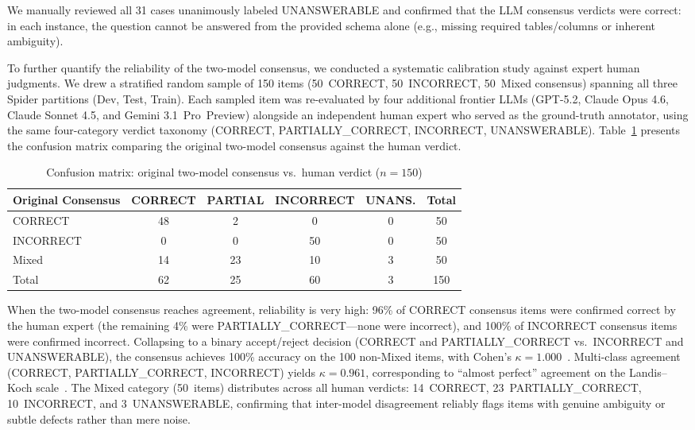 \documentclass[print]{einformatica}
\begin{document}
We manually reviewed all 31 cases unanimously labeled UNANSWERABLE and confirmed that the LLM consensus verdicts were correct: in each instance, the question cannot be answered from the provided schema alone (e.g., missing required tables/columns or inherent ambiguity).

\label{sec:calibration}To further quantify the reliability of the two-model consensus, we conducted a systematic calibration study against expert human judgments. We drew a stratified random sample of 150 items (50~CORRECT, 50~INCORRECT, 50~Mixed consensus) spanning all three Spider partitions (Dev, Test, Train). Each sampled item was re-evaluated by four additional frontier LLMs (GPT-5.2, Claude Opus 4.6, Claude Sonnet 4.5, and Gemini 3.1~Pro~Preview) alongside an independent human expert who served as the ground-truth annotator, using the same four-category verdict taxonomy (CORRECT, PARTIALLY\_CORRECT, INCORRECT, UNANSWERABLE). Table~\ref{tab:calibration} presents the confusion matrix comparing the original two-model consensus against the human verdict.

\begin{table}[ht]
    \caption{Confusion matrix: original two-model consensus vs.\ human verdict ($n=150$)}
    \label{tab:calibration}
    \centering
    \footnotesize
    \begin{tabular}{lccccc}
        \toprule
        \textbf{Original Consensus} & \textbf{CORRECT} & \textbf{PARTIAL} & \textbf{INCORRECT} & \textbf{UNANS.} & \textbf{Total} \\
        \midrule
        CORRECT          & 48 & 2  & 0  & 0 & 50 \\
        INCORRECT        & 0  & 0  & 50 & 0 & 50 \\
        Mixed            & 14 & 23 & 10 & 3 & 50 \\
        \midrule
        Total            & 62 & 25 & 60 & 3 & 150 \\
        \bottomrule
    \end{tabular}
\end{table}

When the two-model consensus reaches agreement, reliability is very high: 96\% of CORRECT consensus items were confirmed correct by the human expert (the remaining 4\% were PARTIALLY\_CORRECT---none were incorrect), and 100\% of INCORRECT consensus items were confirmed incorrect. Collapsing to a binary accept/reject decision (CORRECT and PARTIALLY\_CORRECT vs.\ INCORRECT and UNANSWERABLE), the consensus achieves 100\% accuracy on the 100 non-Mixed items, with Cohen's $\kappa = 1.000$~\cite{cohen1960coefficient}. Multi-class agreement (CORRECT, PARTIALLY\_CORRECT, INCORRECT) yields $\kappa = 0.961$, corresponding to ``almost perfect'' agreement on the Landis--Koch scale~\cite{landis1977measurement}. The Mixed category (50~items) distributes across all human verdicts: 14~CORRECT, 23~PARTIALLY\_CORRECT, 10~INCORRECT, and 3~UNANSWERABLE, confirming that inter-model disagreement reliably flags items with genuine ambiguity or subtle defects rather than mere noise.
\end{document}
